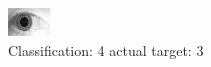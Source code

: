 \begin{figure}[h!]
\begin{center}
\includegraphics[width=0.60\columnwidth]{figures/ID1812_class_4_target_3.png}
\end{center}
\caption{ Classification: 4 actual target: 3}
\label{fig:ID1812_class_4_target_3}
\end{figure}

